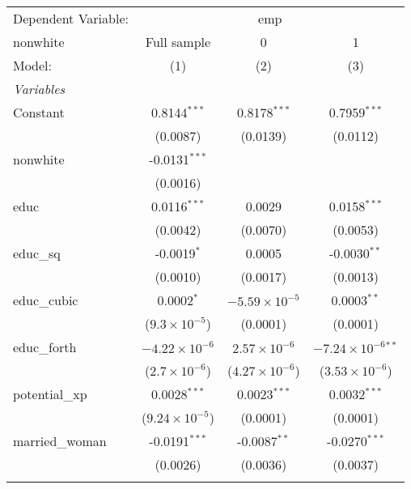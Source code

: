 \begingroup
\centering
\begin{tabular}{lccc}
   \tabularnewline \midrule \midrule
   Dependent Variable: & \multicolumn{3}{c}{emp}\\
   nonwhite        & Full sample             & 0                       & 1 \\   
   Model:          & (1)                     & (2)                     & (3)\\  
   \midrule
   \emph{Variables}\\
   Constant        & 0.8144$^{***}$          & 0.8178$^{***}$          & 0.7959$^{***}$\\   
                   & (0.0087)                & (0.0139)                & (0.0112)\\   
   nonwhite        & -0.0131$^{***}$         &                         &   \\   
                   & (0.0016)                &                         &   \\   
   educ            & 0.0116$^{***}$          & 0.0029                  & 0.0158$^{***}$\\   
                   & (0.0042)                & (0.0070)                & (0.0053)\\   
   educ\_sq        & -0.0019$^{*}$           & 0.0005                  & -0.0030$^{**}$\\   
                   & (0.0010)                & (0.0017)                & (0.0013)\\   
   educ\_cubic     & 0.0002$^{*}$            & $-5.59\times 10^{-5}$   & 0.0003$^{**}$\\   
                   & ($9.3\times 10^{-5}$)   & (0.0001)                & (0.0001)\\   
   educ\_forth     & $-4.22\times 10^{-6}$   & $2.57\times 10^{-6}$    & $-7.24\times 10^{-6}$$^{**}$\\    
                   & ($2.7\times 10^{-6}$)   & ($4.27\times 10^{-6}$)  & ($3.53\times 10^{-6}$)\\    
   potential\_xp   & 0.0028$^{***}$          & 0.0023$^{***}$          & 0.0032$^{***}$\\   
                   & ($9.24\times 10^{-5}$)  & (0.0001)                & (0.0001)\\   
   married\_woman  & -0.0191$^{***}$         & -0.0087$^{**}$          & -0.0270$^{***}$\\   
                   & (0.0026)                & (0.0036)                & (0.0037)\\   
$$
\end{tabular}
